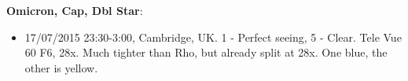 {\bf Omicron, Cap, Dbl Star}:
\begin{itemize}
\item 17/07/2015 23:30-3:00, Cambridge, UK. 1 - Perfect seeing, 5 - Clear. Tele Vue 60 F6, 28x. Much tighter than Rho, but already split at 28x. One blue, the other is yellow.
\end{itemize}

